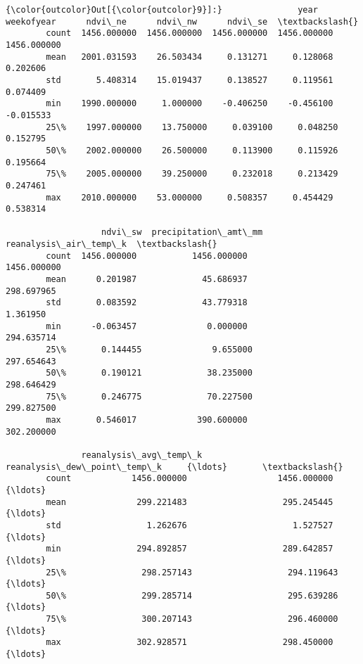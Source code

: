 \documentclass[11pt]{article}
\begin{document}
\begin{Verbatim}[commandchars=\\\{\}]
{\color{outcolor}Out[{\color{outcolor}9}]:}               year   weekofyear      ndvi\_ne      ndvi\_nw      ndvi\_se  \textbackslash{}
        count  1456.000000  1456.000000  1456.000000  1456.000000  1456.000000   
        mean   2001.031593    26.503434     0.131271     0.128068     0.202606   
        std       5.408314    15.019437     0.138527     0.119561     0.074409   
        min    1990.000000     1.000000    -0.406250    -0.456100    -0.015533   
        25\%    1997.000000    13.750000     0.039100     0.048250     0.152795   
        50\%    2002.000000    26.500000     0.113900     0.115926     0.195664   
        75\%    2005.000000    39.250000     0.232018     0.213429     0.247461   
        max    2010.000000    53.000000     0.508357     0.454429     0.538314   
        
                   ndvi\_sw  precipitation\_amt\_mm  reanalysis\_air\_temp\_k  \textbackslash{}
        count  1456.000000           1456.000000            1456.000000   
        mean      0.201987             45.686937             298.697965   
        std       0.083592             43.779318               1.361950   
        min      -0.063457              0.000000             294.635714   
        25\%       0.144455              9.655000             297.654643   
        50\%       0.190121             38.235000             298.646429   
        75\%       0.246775             70.227500             299.827500   
        max       0.546017            390.600000             302.200000   
        
               reanalysis\_avg\_temp\_k  reanalysis\_dew\_point\_temp\_k     {\ldots}       \textbackslash{}
        count            1456.000000                  1456.000000     {\ldots}        
        mean              299.221483                   295.245445     {\ldots}        
        std                 1.262676                     1.527527     {\ldots}        
        min               294.892857                   289.642857     {\ldots}        
        25\%               298.257143                   294.119643     {\ldots}        
        50\%               299.285714                   295.639286     {\ldots}        
        75\%               300.207143                   296.460000     {\ldots}        
        max               302.928571                   298.450000     {\ldots}        
        

\end{Verbatim}
\end{document}
